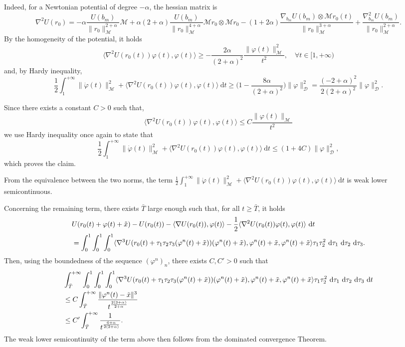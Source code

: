 \documentclass[a4paper,10pt]{amsart}
\newcommand{\ud}{\mathrm{d}}
\theoremstyle{plain}
\theoremstyle{definition}
\numberwithin{equation}{section}
\numberwithin{thm}{section}
\begin{document}
Indeed, for a Newtonian potential of degree $-\alpha$, the hessian matrix is
\[
\nabla^2 U(r_0) = -\alpha\frac{U(b_m)}{\|r_0\|_\mathcal{M}^{2+\alpha}}\mathcal{M} + \alpha(2+\alpha)\frac{U(b_m)}{\|r_0\|_\mathcal{M}^{4+\alpha}}\mathcal{M}r_0\otimes\mathcal{M}r_0 - (1+2\alpha)\frac{\nabla_{b_m}U(b_m)\otimes \mathcal{M}r_0(t)}{\|r_0\|_\mathcal{M}^{3+\alpha}} + \frac{\nabla_{b_m}^2 U(b_m)}{\|r_0\|_\mathcal{M}^{2+\alpha}}.
\]
By the homogeneity of the potential, it holds 
\[
\langle \nabla^2 U(r_0(t))\varphi(t),\varphi(t)\rangle \geq -\frac{2\alpha}{(2+\alpha)^2}\frac{\|\varphi(t)\|_\mathcal{M}^2}{t^2},\quad\forall t\in[1,+\infty)
\]
and, by Hardy inequality,
\[
\frac{1}{2}\int_{1}^{+\infty} \|\dot{\varphi}(t)\|_\mathcal{M}^2 + \langle \nabla^2 U(r_0(t))\varphi(t),\varphi(t)\rangle\ \ud t \geq \bigg( 1-\frac{8\alpha}{(2+\alpha)^2} \bigg)\|\varphi\|^2_\mathcal{D} = \frac{(-2+\alpha)^2}{2(2+\alpha)^2}\|\varphi\|_\mathcal{D}^2.
\]
        
Since there exists a constant $C>0$ such that,
\[
\langle \nabla^2 U(r_0(t))\varphi(t),\varphi(t)\rangle \leq C\frac{\|\varphi(t)\|_\mathcal{M}}{t^2}
\]
we use Hardy inequality once again to state that
\[
\frac{1}{2}\int_{1}^{+\infty} \|\dot{\varphi}(t)\|_\mathcal{M}^2 + \langle \nabla^2 U(r_0(t))\varphi(t),\varphi(t)\rangle\ \ud t \leq (1+4C)\|\varphi\|_\mathcal{D}^2,
\]
which proves the claim.

From the equivalence between the two norms, the term $\frac{1}{2}\int_{1}^{+\infty} \|\dot{\varphi}(t)\|_\mathcal{M}^2 + \langle \nabla^2 U(r_0(t))\varphi(t),\varphi(t)\rangle\ \ud t$ is weak lower semicontinuous.

Concerning the remaining term, there exists $\bar T$ large enough such that, for all $t\ge \bar T$, it holds 
\[
    \begin{split}
     & U(r_0(t)+\varphi(t)+\Tilde{x}) - U(r_0(t)) - \langle \nabla U(r_0(t)),\varphi(t)\rangle - \frac{1}{2}\langle \nabla^2 U(r_0(t))\varphi(t),\varphi(t)\rangle\ \ud t \\
    & = \int_{0}^{1}\int_{0}^{1}\int_{0}^{1} \langle \nabla^3 U(r_0(t) + \tau_1\tau_2\tau_3 (\varphi^n(t)+\Tilde{x}))(\varphi^n(t)+\Tilde{x}),\varphi^n(t)+\Tilde{x},\varphi^n(t)+\Tilde{x}\rangle \tau_1 \tau_2^2\ \ud \tau_1\ \ud \tau_2\ \ud \tau_3.
     \end{split}
\]
Then, using the boundedness of the sequence $(\varphi^n)_n$, there exists $C,C'>0$ such that
\[
\begin{split}
&\int_{\bar T}^{+\infty} \int_{0}^{1}\int_{0}^{1}\int_{0}^{1} \langle \nabla^3 U(r_0(t) + \tau_1\tau_2\tau_3 (\varphi^n(t)+\Tilde{x}))(\varphi^n(t)+\Tilde{x}),\varphi^n(t)+\Tilde{x},\varphi^n(t)+\Tilde{x}\rangle \tau_1 \tau_2^2\ \ud \tau_1\ \ud \tau_2\ \ud \tau_3\ \ud t \\
& \le C\int_{\bar T}^{+\infty} \frac{\|\varphi^n(t) - \tilde x\|^3}{t^{\frac{2(3+\alpha)}{2+\alpha}}}\\
& \le C'\int_{\bar T}^{+\infty} \frac{1}{t^\frac{6+\alpha}{2(2+\alpha)}}.
\end{split}
\]
The weak lower semicontinuity of the term above then follows from the dominated convergence Theorem.
\end{document}
